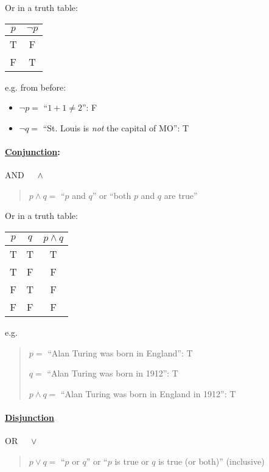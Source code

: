 \documentclass[../main.tex]{subfiles}
\begin{document}
Or in a truth table:
\begin{table}[ht]
    \centering
    \begin{tabular}{c|c}
        $p$ & $\neg p$ \\
        \hline
        T & F \\
        F & T
    \end{tabular}
\end{table}

e.g. from before:

\begin{itemize}
    \item $\neg p = $ ``$1 + 1 \neq 2$'': F
    \item $\neg q = $ ``St. Louis is \emph{not} the capital of MO'': T
\end{itemize}

\paragraph{\underline{Conjunction}:} AND $\quad \land$

\begin{quote}
    $p \land q =$ ``$p$ and $q$'' or ``both $p$ and $q$ are true''
\end{quote}

Or in a truth table:
\begin{table}[ht]
    \centering
    \begin{tabular}{c|c|c}
        $p$ & $q$ & $p \land q$ \\
        \hline
        T & T & T \\
        T & F & F \\
        F & T & F \\
        F & F & F
    \end{tabular}
\end{table}

e.g.
\begin{quote}
    $p = $ ``Alan Turing was born in England'': T

    $q = $ ``Alan Turing was born in 1912'': T

    $p \land q = $ ``Alan Turing was born in England in 1912'': T
\end{quote}

\paragraph{\underline{Disjunction}} OR $\quad \lor$

\begin{quote}
    $p \lor q =$ ``$p$ or $q$'' or ``$p$ is true or $q$ is true (or both)'' (inclusive)
\end{quote}
\end{document}

